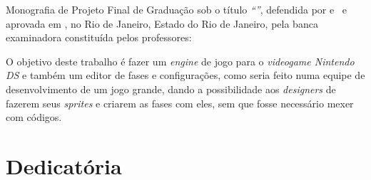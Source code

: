 \documentclass[brazil]{abnt}
\begin{document}

\Ncapa
\NFolhaDeRosto

\begin{folhadeaprovacao}
Monografia de Projeto Final de Graduação sob o título \textit{``\ABNTtitulodata''},
defendida por \ABNTautordata e \ABNTcoautordata~e aprovada em \ABNTdatadata, no Rio de Janeiro,
Estado do Rio de Janeiro, pela banca examinadora constituída pelos
professores: \setlength{\ABNTsignthickness}{0.4pt}

  
\end{folhadeaprovacao}

\begin{resumo}
O objetivo deste trabalho é fazer um \textit{engine} de jogo para o \textit{videogame Nintendo DS\texttrademark} e também um editor de fases 
e configurações, como seria feito numa equipe de desenvolvimento de um jogo grande, dando a possibilidade aos \textit{designers} 
de fazerem seus \textit{sprites} e criarem as fases com eles, sem que fosse necessário mexer com códigos.
\end{resumo}

\begin{abstract}
The objective of this paper is to make a game engine to the Nintendo DS\texttrademark system and a level and configurations editor, as it
would be done in a development team in a big game, giving designers the possibility to make their sprites and create their levels 
without touching actual source code.
\end{abstract}

\chapter*{Dedicatória}
\end{document}
